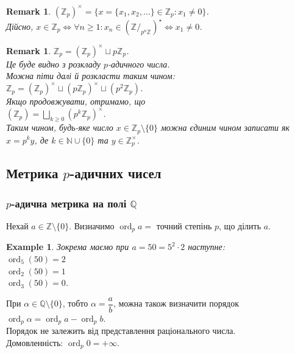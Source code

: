 \documentclass[a4paper, 10pt]{article}
\theoremstyle{theoremdd}
\theoremstyle{theoremdd}
\theoremstyle{theoremdd}
\theoremstyle{theoremdd}
\newtheorem{example}[theorem]{Example}
\theoremstyle{theoremdd}
\theoremstyle{theoremdd}
\newtheorem{remark}[theorem]{Remark}
\theoremstyle{theoremdd}
\theoremstyle{theoremdd}
\DeclareMathOperator{\ord}{ord}
\begin{document}
\begin{remark}
$(\mathbb{Z}_p)^\times = \{ x = \{x_1,x_2,\dots\} \in \mathbb{Z}_p : x_1 \neq 0\}$.\\
Дійсно, $x \in \mathbb{Z}_p \iff \forall n \geq 1: x_n \in (\mathbb{Z}/_{p^n \mathbb{Z}})^\star \iff x_1 \neq 0$.
\end{remark}

\begin{remark}
$\mathbb{Z}_p = (\mathbb{Z}_p)^\times \sqcup p \mathbb{Z}_p$.\\
Це буде видно з розкладу $p$-адичного числа.
\bigskip \\
Можна піти далі й розкласти таким чином:\\
$\mathbb{Z}_p = (\mathbb{Z}_p)^\times \sqcup (p \mathbb{Z}_p)^\times \sqcup (p^2 \mathbb{Z}_p)$.\\
Якщо продовжувати, отримамо, що\\
$(\mathbb{Z}_p) = \displaystyle\bigsqcup_{k \geq 0} (p^k \mathbb{Z}_p)^\times$.\\
Таким чином, будь-яке число $x \in \mathbb{Z}_p \setminus \{0\}$ можна єдиним чином записати як $x = p^k y$, де $k \in \mathbb{N} \cup \{0\}$ та $y \in \mathbb{Z}_p^\times$.
\end{remark}

\subsection{Метрика $p$-адичних чисел}
\subsubsection*{$p$-адична метрика на полі $\mathbb{Q}$}
Нехай $a \in \mathbb{Z} \setminus \{0\}$. Визначимо $\ord_p a = $ точний степінь $p$, що ділить $a$.

\begin{example}
Зокрема маємо при $a = 50 = 5^2 \cdot 2$ наступне:\\
$\ord_5(50) = 2$\\
$\ord_2(50) = 1$\\
$\ord_3(50) = 0$.
\end{example}

При $\alpha \in \mathbb{Q} \setminus \{0\}$, тобто $\alpha = \dfrac{a}{b}$, можна також визначити порядок $\ord_p \alpha = \ord_p a - \ord_p b$.\\
Порядок не залежить від представлення раціонального числа.
\bigskip \\
Домовленність: $\ord_p 0 = +\infty$.
\end{document}
